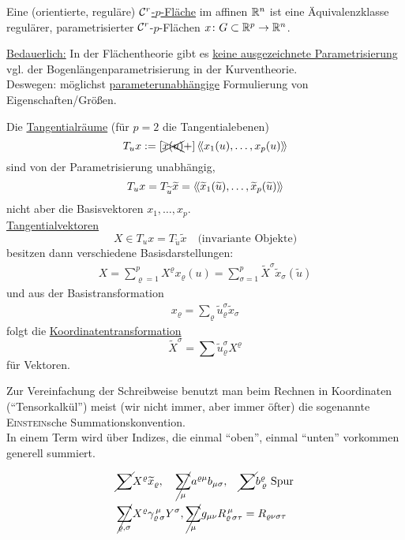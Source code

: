 \begin{definition}
Eine (orientierte, reguläre) \uline{\(\mathcal{C}^r\)-\(p\)-Fläche} im affinen \( \mathbb{R}^n\) ist eine Äquivalenzklasse regulärer, parametrisierter \(\mathcal{C}^r\)-\(p\)-Flächen \(x \colon G \subset \mathbb{R}^p \rightarrow \mathbb{R}^n\).
\end{definition}

\uline{Bedauerlich:}
In der Flächentheorie gibt es \uline{keine ausgezeichnete Parametrisierung} vgl. der Bogenlängenparametrisierung in der Kurventheorie. \\
Deswegen: möglichst \uline{parameterunabhängige} Formulierung von Eigenschaften/Größen. 

\begin{bsp}
 Die \uline{Tangentialräume} (für \(p = 2\) die Tangentialebenen)
 \[
  T_u x := \left[\xcancel{x(u)} + \right] \left\langle\!\left\langle x_1(u) , \dots, x_p(u) \right\rangle\!\right\rangle
 \]
 sind von der Parametrisierung unabhängig,
 \[
  T_u x = T_{\widetilde u}\widetilde x = \left\langle\!\left\langle \widetilde x_1( \widetilde u) , \dots, \widetilde x_p ( \widetilde u) \right\rangle\!\right\rangle
 \]
 nicht aber die Basisvektoren \(x_1, \dots, x_p\). \\
 \uline{Tangentialvektoren}
 \[
  X \in T_u x = T_{\widetilde u} \widetilde x \quad \text{(invariante Objekte)}
 \]
 besitzen dann verschiedene Basisdarstellungen:
 \begin{align*}
  X = \sum_{\varrho = 1}^p X^\varrho x_\varrho (u) = \sum_{\sigma = 1}^p \widetilde X^\sigma \widetilde x_\sigma ( \widetilde u)
 \end{align*}
 und aus der Basistransformation
 \begin{align*}
  x_\varrho = \sum_\varrho \widetilde u_\varrho^\sigma \widetilde x_\sigma
 \end{align*}
 folgt die \uline{Koordinatentransformation}
 \[
  \widetilde X^\sigma = \sum \widetilde u_\varrho^\sigma X^\varrho
 \]
 für Vektoren.
\end{bsp}

\begin{bemerkung}
 Zur Vereinfachung der Schreibweise benutzt man beim Rechnen in Koordinaten ("`Tensorkalkül"') meist (wir nicht immer, aber immer öfter) die sogenannte \textsc{Einstein}sche Summationskonvention. \\
 In einem Term wird über Indizes, die einmal "`oben"', einmal "`unten"' vorkommen generell summiert.
 \begin{bsp}
  \begin{align*}
  &\cancel{\sum} X^\varrho \widetilde x_\varrho, \quad \cancel{\sum_\mu} a^{\varrho \mu} b_{\mu \sigma}, \quad \cancel{\sum} b^{\varrho}_{\, \varrho} \text{ Spur} \\
  & \cancel{\sum_{\varrho, \sigma}} X^\varrho \gamma_{\varrho\,\sigma}^{\,\mu} Y^\sigma, \cancel{\sum_\mu} g_{\mu \nu} R_{\varrho \, \sigma \tau}^{\,\mu} = R_{\varrho \nu \sigma \tau}
  \end{align*}
 \end{bsp}
\end{bemerkung}

